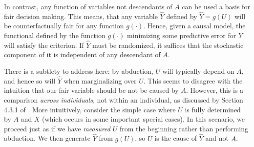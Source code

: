 In contrast, any function of variables not descendants of
$A$ can be used a basis for fair decision making. This means,
that any variable $\hat Y$ defined by $\hat Y = g(U)$ will be counterfactually
fair for any function $g(\cdot)$. Hence, given a causal
model, the functional defined by the function $g(\cdot)$ 
minimizing some predictive error for $Y$ will satisfy the criterion.
If $\hat Y$ must be randomized, it suffices that the
stochastic component of it is independent of any descendant of $A$.


There is a subtlety to address here: by abduction,
$U$ will typically depend on $A$, and hence so will $\hat Y$ when
marginalizing over $U$.
This seems to disagree with the intuition that our fair
variable should be not be caused by $A$. However, this is a comparison
{\it across individuals}, not within an individual, as discussed by
Section 4.3.1 of \citep{pearl:16}. More intuitively, consider the
simple case where $U$ is fully determined by $A$ and $X$ (which occurs
in some important special cases).
In this
scenario, we proceed just as if we have {\it measured} $U$ from the
beginning rather than performing abduction.
We then generate $\hat Y$ from $g(U)$, so $U$ is the cause of
$\hat Y$ and not $A$. 


